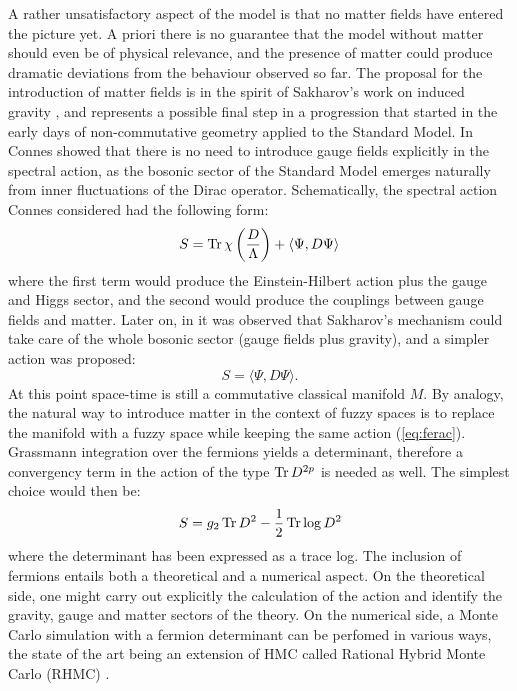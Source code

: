 \begin{enumerate}
A rather unsatisfactory aspect of the model is that no matter fields have entered the picture yet. A priori there is no guarantee that the model without matter should even be of physical relevance, and the presence of matter could produce dramatic deviations from the behaviour observed so far.\newline
The proposal for the introduction of matter fields is in the spirit of Sakharov's work on induced gravity \cite{sak}, and represents a possible final step in a progression that started in the early days of non-commutative geometry applied to the Standard Model. In \cite{connesGRAVMAT} Connes showed that there is no need to introduce gauge fields explicitly in the spectral action, as the bosonic sector of the Standard Model emerges naturally from inner fluctuations of the Dirac operator. Schematically, the spectral action Connes considered had the following form:
\begin{equation}
S = \operatorname{Tr} \chi \left( \frac{D}{\Lambda} \right) + \langle \Psi, D \Psi \rangle
\end{equation}
where the first term would produce the Einstein-Hilbert action plus the gauge and Higgs sector, and the second would produce the couplings between gauge fields and matter. Later on, in \cite{barrettIND} it was observed that Sakharov's mechanism could take care of the whole bosonic sector (gauge fields plus gravity), and a simpler action was proposed:
\begin{equation}\label{eq:ferac}
S = \langle \Psi, D \Psi \rangle.
\end{equation}
At this point space-time is still a commutative classical manifold $M$. By analogy, the natural way to introduce matter in the context of fuzzy spaces is to replace the manifold with a fuzzy space while keeping the same action (\ref{eq:ferac}). Grassmann integration over the fermions yields a determinant, therefore a convergency term in the action of the type $\operatorname{Tr} D^{2p}$ is needed as well. The simplest choice would then be:
\begin{equation}
S = g_2 \operatorname{Tr} D^2 - \frac{1}{2} \operatorname{Tr} \log D^2
\end{equation}
where the determinant has been expressed as a trace log.\newline
The inclusion of fermions entails both a theoretical and a numerical aspect. On the theoretical side, one might carry out explicitly the calculation of the action and identify the gravity, gauge and matter sectors of the theory. On the numerical side, a Monte Carlo simulation with a fermion determinant can be perfomed in various ways, the state of the art being an extension of HMC called Rational Hybrid Monte Carlo (RHMC) \cite{rhmc}.
\end{enumerate}